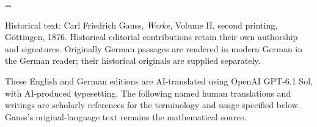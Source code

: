 \clearpage
\newcount\SavedTranslationPage
\SavedTranslationPage=\value{page}
\hypersetup{pageanchor=false}
\begingroup
\pagestyle{empty}\thispagestyle{empty}
\medskip
\small\raggedright
Historical text: Carl Friedrich Gauss, \emph{Werke}, Volume II, second printing, Göttingen, 1876. Historical editorial contributions retain their own authorship and signatures. Originally German passages are rendered in modern German in the German reader; their historical originals are supplied separately.

These English and German editions are AI-translated using OpenAI GPT-6.1 Sol, with AI-produced typesetting. The following named human translations and writings are scholarly references for the terminology and usage specified below. Gauss's original-language text remains the mathematical source.

